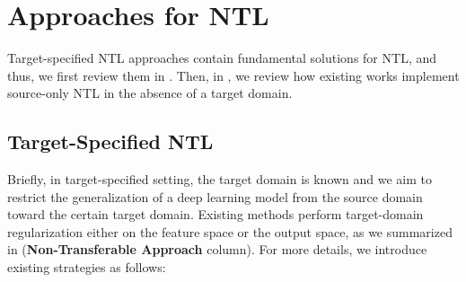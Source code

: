 

\section{Approaches for NTL}
\label{sec:immeNTL}

Target-specified NTL approaches contain fundamental solutions for NTL, and thus, we first review them in . Then, in , we review how existing works implement source-only NTL in the absence of a target domain.


\subsection{Target-Specified NTL}
\label{sec:target-specified}

Briefly, in target-specified setting, the target domain is known and we aim to restrict the generalization of a deep learning model from the source domain toward the certain target domain. 
Existing methods perform target-domain regularization either on the feature space or the output space, as we summarized in  (\textbf{Non-Transferable Approach} column). For more details, we introduce existing strategies as follows:

